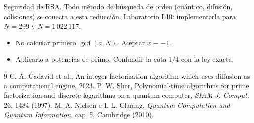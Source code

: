 \documentclass[11pt,a4paper]{article}
\begin{document}
\begin{aplicacion}
Seguridad de RSA. Todo método de búsqueda de orden (cuántico, difusión, colisiones) se conecta a esta reducción. Laboratorio L10: implementarla para $N=299$ y $N=1\,022\,117$.
\end{aplicacion}

\begin{error}
\begin{itemize}[nosep]
\item No calcular primero $\gcd(a,N)$. \quad Aceptar $x\equiv-1$.
\item Aplicarlo a potencias de primo. \quad Confundir la cota $1/4$ con la ley exacta.
\end{itemize}
\end{error}

\begin{thebibliography}{9}\small
{} C. A. Cadavid et al., An integer factorization algorithm which uses diffusion as a computational engine, 2023.
 P. W. Shor, Polynomial-time algorithms for prime factorization and discrete logarithms on a quantum computer, \emph{SIAM J. Comput.} 26, 1484 (1997).
 M. A. Nielsen e I. L. Chuang, \emph{Quantum Computation and Quantum Information}, cap. 5, Cambridge (2010).
\end{thebibliography}
\end{document}
